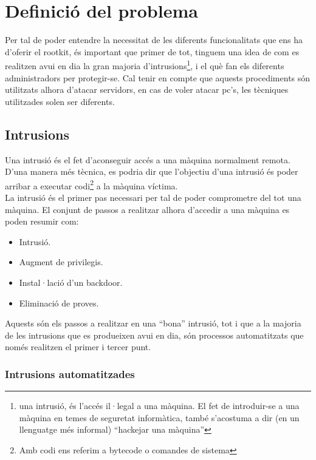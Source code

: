 \chapter{Definició del problema}

Per tal de poder entendre la necessitat de les diferents funcionalitats que ens ha d'oferir el rootkit,
és important que primer de tot, tinguem una idea de com es realitzen avui en dia la gran majoria
d'intrusions\footnote{una intrusió, és l'accés il·legal a una màquina. El fet de introduir-se a una màquina
en temes de seguretat informàtica, també s'acostuma a dir (en un llenguatge més informal) ``hackejar una màquina''},
i el què fan els diferents administradors per protegir-se. Cal tenir en compte que aquests procediments són 
utilitzats alhora d'atacar servidors, en cas de voler atacar pc's, les tècniques utilitzades solen ser diferents.

\section{Intrusions}

Una intrusió és el fet d'aconseguir accés a una màquina normalment remota. D'una manera més tècnica, es podria dir
que l'objectiu d'una intrusió és poder arribar a executar codi\footnote{Amb codi ens referim a bytecode o comandes de sistema} 
a la màquina víctima. \\

La intrusió és el primer pas necessari per tal de poder comprometre del tot una màquina. El conjunt de passos a 
realitzar alhora d'accedir a una màquina es poden resumir com:

\begin{itemize}
\item Intrusió.
\item Augment de privilegis.
\item Instal·lació d'un backdoor.
\item Eliminació de proves.
\end{itemize}

Aquests són els passos a realitzar en una ``bona'' intrusió, tot i que a la majoria de les intrusions que es produeixen
avui en dia, són processos automatitzats que només realitzen el primer i tercer punt.

\subsection{Intrusions automatitzades} 

